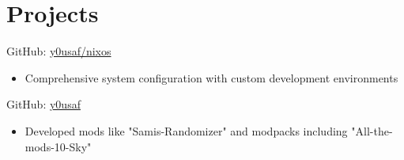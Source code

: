 \documentclass[letterpaper,10pt]{article}
\begin{document}
\vspace{6pt}

\section{Projects}

\hspace{0.15in}{\bfseries NixOS Configuration} \hfill {\small GitHub: \href{https://github.com/y0usaf/nixos}{y0usaf/nixos}}
\vspace{-2pt}
\begin{itemize}[leftmargin=0.35in, itemsep=-2pt, topsep=0pt, labelsep=0.035in]
\item Comprehensive system configuration with custom development environments
\end{itemize}
\vspace{-2pt}

\hspace{0.15in}{\bfseries Minecraft Modding} \hfill {\small GitHub: \href{https://github.com/y0usaf}{y0usaf}}
\vspace{-2pt}
\begin{itemize}[leftmargin=0.35in, itemsep=-2pt, topsep=0pt, labelsep=0.035in]
\item Developed mods like "Samis-Randomizer" and modpacks including "All-the-mods-10-Sky"
\end{itemize}
\vspace{-2pt}
\end{document}
